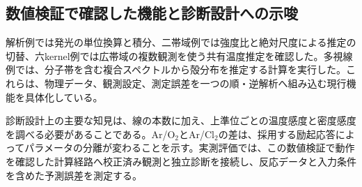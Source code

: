 \subsection{数値検証で確認した機能と診断設計への示唆}
解析例では発光の単位換算と積分、二帯域例では強度比と絶対尺度による推定の切替、六kernel例では広帯域の複数観測を使う共有温度推定を確認した。多視線例では、分子帯を含む複合スペクトルから殻分布を推定する計算を実行した。これらは、物理データ、観測設定、測定誤差を一つの順・逆解析へ組み込む現行機能を具体化している。

診断設計上の主要な知見は、線の本数に加え、上準位ごとの温度感度と密度感度を調べる必要があることである。Ar/O$_2$とAr/Cl$_2$の差は、採用する励起応答によってパラメータの分離が変わることを示す。実測評価では、この数値検証で動作を確認した計算経路へ校正済み観測と独立診断を接続し、反応データと入力条件を含めた予測誤差を測定する。
